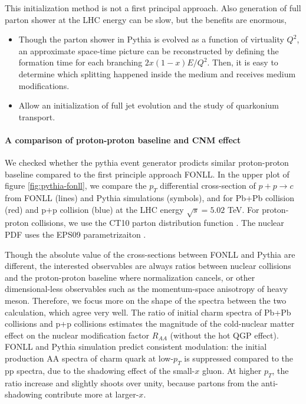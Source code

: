This initialization method is not a first principal approach. Also generation of full parton shower at the LHC energy can be slow, but the benefits are enormous,
\begin{itemize}
\item Though the parton shower in Pythia is evolved as a function of virtuality $Q^2$,
an approximate space-time picture can be reconstructed by defining the formation time for each branching $2x(1-x)E/Q^2$. Then, it is easy to determine which splitting happened inside the medium and receives medium modifications.
\item Allow an initialization of full jet evolution and the study of quarkonium transport.
\end{itemize}

\paragraph{A comparison of proton-proton baseline and CNM effect}
We checked whether the pythia event generator prodicts similar proton-proton baseline compared to the first principle approach FONLL.
In the upper plot of figure \ref{fig:pythia-fonll}, we compare the $p_T$ differential cross-section of $p+p\rightarrow c$ from FONLL (lines) and Pythia simulations (symbols), and for Pb+Pb collision (red) and p+p collision (blue) at the LHC energy $\sqrt{s}=5.02$ TeV.
For proton-proton collisions, we use the CT10 parton distribution function \cite{Lai:2010vv}.
The nuclear PDF uses the EPS09 parametrizaiton \cite{Eskola:2009uj}.

Though the absolute value of the cross-sections between FONLL and Pythia are different, the interested observables are always ratios between nuclear collisions and the proton-proton baseline where normalization cancels, or other dimensional-less observables such as the momentum-space anisotropy of heavy meson.
Therefore, we focus more on the shape of the spectra between the two calculation, which agree very well.
The ratio of initial charm spectra of Pb+Pb collisions and p+p collisions estimates the magnitude of the cold-nuclear matter effect on the nuclear modification factor $R_{AA}$ (without the hot QGP effect).
FONLL and Pythia simulation predict consistent modulation: the initial production AA spectra of charm quark at low-$p_T$ is suppressed compared to the pp spectra, due to the shadowing effect of the small-$x$ gluon. 
At higher $p_T$, the ratio increase and slightly shoots over unity, because partons from the anti-shadowing contribute more at larger-$x$.

